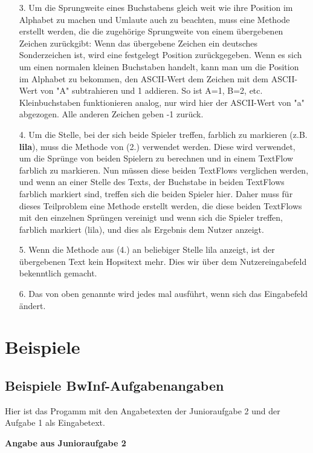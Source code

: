\documentclass[a4paper,10pt,ngerman]{scrartcl}
\begin{document}
\begin{itemize}
\begin{itemize}
  \end{itemize}
  \item [3.] Um die Sprungweite eines Buchstabens gleich weit wie ihre Position im Alphabet zu machen und Umlaute auch zu beachten, muss eine Methode erstellt werden, die die zugehörige Sprungweite von einem übergebenen Zeichen zurückgibt:
  Wenn das übergebene Zeichen ein deutsches Sonderzeichen ist, wird eine festgelegt Position zurückgegeben. Wenn es sich um einen normalen kleinen Buchstaben handelt, kann man um die Position im Alphabet zu bekommen, den ASCII-Wert dem Zeichen mit dem ASCII-Wert von "A" subtrahieren und 1 addieren. So ist A=1, B=2, etc.
  Kleinbuchstaben funktionieren analog, nur wird hier der ASCII-Wert von "a" abgezogen. Alle anderen Zeichen geben -1 zurück.
  \item[4.] Um die Stelle, bei der sich beide Spieler treffen, farblich zu markieren (z.B. \textbf{lila}), muss die Methode von (2.) verwendet werden. Diese wird verwendet, um die Sprünge von beiden Spielern zu berechnen und in einem TextFlow farblich zu markieren.
  Nun müssen diese beiden TextFlows verglichen werden, und wenn an einer Stelle des Texts, der Buchstabe in beiden TextFlows farblich markiert sind, treffen sich die beiden Spieler hier. Daher muss für dieses Teilproblem eine Methode erstellt werden, die diese beiden TextFlows mit den einzelnen Sprüngen vereinigt und 
  wenn sich die Spieler treffen, farblich markiert (lila), und dies als Ergebnis dem Nutzer anzeigt.
  \item[5.] Wenn die Methode aus (4.) an beliebiger Stelle lila anzeigt, ist der übergebenen Text kein Hopsitext mehr. Dies wir über dem Nutzereingabefeld bekenntlich gemacht.
  \item[6.] Das von oben genannte wird jedes mal ausführt, wenn sich das Eingabefeld ändert.
\end{itemize}

\newpage

\section{Beispiele}
\subsection{Beispiele BwInf-Aufgabenangaben}
Hier ist das Progamm mit den Angabetexten der Junioraufgabe 2 und der Aufgabe 1 als Eingabetext.
\newline

\textbf{Angabe aus Junioraufgabe 2}
\newline
\end{document}
